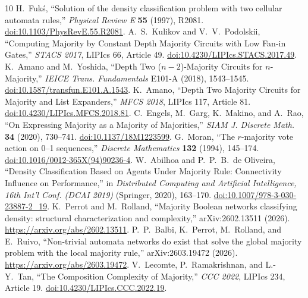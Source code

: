 \documentclass[11pt,a4paper]{article}
\begin{document}
\begin{thebibliography}{10}\footnotesize
{} H.~Fuk\'s, ``Solution of the density classification problem with two cellular automata rules,'' \emph{Physical Review E} \textbf{55} (1997), R2081. \href{https://doi.org/10.1103/PhysRevE.55.R2081}{doi:10.1103/PhysRevE.55.R2081}.
 A.~S.~Kulikov and V.~V.~Podolskii, ``Computing Majority by Constant Depth Majority Circuits with Low Fan-in Gates,'' \emph{STACS 2017}, LIPIcs 66, Article 49. \href{https://doi.org/10.4230/LIPIcs.STACS.2017.49}{doi:10.4230/LIPIcs.STACS.2017.49}.
 K.~Amano and M.~Yoshida, ``Depth Two ($n-2$)-Majority Circuits for $n$-Majority,'' \emph{IEICE Trans. Fundamentals} E101-A (2018), 1543--1545. \href{https://doi.org/10.1587/transfun.E101.A.1543}{doi:10.1587/transfun.E101.A.1543}.
 K.~Amano, ``Depth Two Majority Circuits for Majority and List Expanders,'' \emph{MFCS 2018}, LIPIcs 117, Article 81. \href{https://doi.org/10.4230/LIPIcs.MFCS.2018.81}{doi:10.4230/LIPIcs.MFCS.2018.81}.
 C.~Engels, M.~Garg, K.~Makino, and A.~Rao, ``On Expressing Majority as a Majority of Majorities,'' \emph{SIAM J. Discrete Math.} \textbf{34} (2020), 730--741. \href{https://doi.org/10.1137/18M1223599}{doi:10.1137/18M1223599}.
 G.~Moran, ``The $r$-majority vote action on 0--1 sequences,'' \emph{Discrete Mathematics} \textbf{132} (1994), 145--174. \href{https://doi.org/10.1016/0012-365X(94)90236-4}{doi:10.1016/0012-365X(94)90236-4}.
 W.~Abilhoa and P.~P.~B.~de Oliveira, ``Density Classification Based on Agents Under Majority Rule: Connectivity Influence on Performance,'' in \emph{Distributed Computing and Artificial Intelligence, 16th Int'l Conf. (DCAI 2019)} (Springer, 2020), 163--170. \href{https://doi.org/10.1007/978-3-030-23887-2_19}{doi:10.1007/978-3-030-23887-2\_19}.
 K.~Perrot and M.~Rolland, ``Majority Boolean networks classifying density: structural characterization and complexity,'' arXiv:2602.13511 (2026). \url{https://arxiv.org/abs/2602.13511}.
 P.~P.~Balbi, K.~Perrot, M.~Rolland, and E.~Ruivo, ``Non-trivial automata networks do exist that solve the global majority problem with the local majority rule,'' arXiv:2603.19472 (2026). \url{https://arxiv.org/abs/2603.19472}.
 V.~Lecomte, P.~Ramakrishnan, and L.-Y.~Tan, ``The Composition Complexity of Majority,'' \emph{CCC 2022}, LIPIcs 234, Article 19. \href{https://doi.org/10.4230/LIPIcs.CCC.2022.19}{doi:10.4230/LIPIcs.CCC.2022.19}.
\end{thebibliography}
\end{document}
